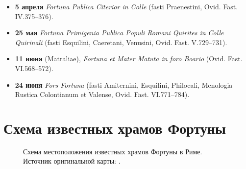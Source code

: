 \begin{appendices}
\begin{itemize}
\item \textbf{5 апреля} \textit{Fortuna Publica Citerior in Colle} (fasti Praenestini, Ovid. Fast. IV.375--376).

\item \textbf{25 мая} \textit{Fortuna Primigenia Publica Populi Romani Quirites in Colle Quirinali} (fasti Esquilini, Caeretani, Venusini, Ovid. Fast. V.729--731).

\item \textbf{11 июня} (Matraliae), \textit{Fortuna et Mater Matuta in foro Boario} (Ovid. Fast. VI.568--572).

\item \textbf{24 июня} \textit{Fors Fortuna} (fasti Amiternini, Esquilini, Philocali, Menologia Rustica Colontianum et Valense, Ovid. Fast. VI.771--784).


\end{itemize}

\pagebreak
\section{Схема известных храмов Фортуны}

\begin{figure}[h!]
\caption{Схема местоположения известных храмов Фортуны в Риме. \footnotesize{Источник оригинальной карты: \cite[Bl. XXII]{Kiepert1894}. }}
\label{pic:Charta}
\end{figure}



\end{appendices}
